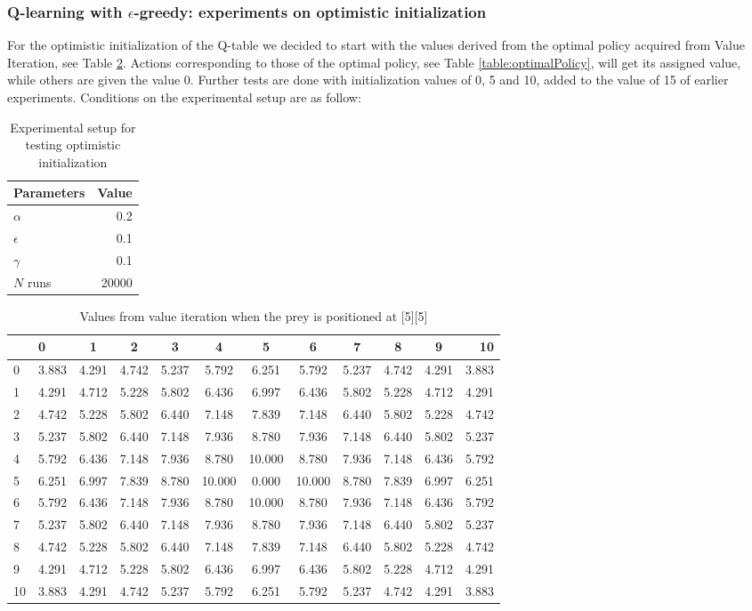\documentclass[paper=a4, fontsize=11pt]{scrartcl}
\numberwithin{equation}{section}		%
\numberwithin{figure}{section}			%
\numberwithin{table}{section}				%
\begin{document}
\subsubsection*{Q-learning with $\epsilon$-greedy: experiments on optimistic initialization}
For the optimistic initialization of the Q-table we decided to start with the values derived from the optimal policy acquired from Value Iteration, see Table \ref{table:vi}. Actions corresponding to those of the optimal policy, see Table \ref{table:optimalPolicy}, will get its assigned value, while others are given the value 0. Further tests are done with initialization values of 0, 5 and 10, added to the value of 15 of earlier experiments. Conditions on the experimental setup are as follow:
\begin{table}[H]
\caption{Experimental setup for testing optimistic initialization}
\centering
\begin{tabular}{|l|r|}
\hline
Parameters & Value \\\hline
$\alpha$ & 0.2 \\\hline
$\epsilon$ & 0.1 \\\hline
$\gamma$ & 0.1\\\hline
$N$ runs & 20000\\\hline
\end{tabular}
\label{expSetupOptimInit}
\end{table}
\begin{table}[H]
\caption{Values from value iteration when the prey is positioned at [5][5]}
\centering
\begin{tabular}{l|l*{9}{c}r}
  \hline
 & 0 & 1 & 2 & 3 & 4 & 5 & 6 & 7 & 8 & 9 & 10 \\ \hline 
0 & 3.883 & 4.291 & 4.742 & 5.237 & 5.792 & 6.251 & 5.792 & 5.237 & 4.742 & 4.291 & 3.883 \\
1 & 4.291 & 4.712 & 5.228 & 5.802 & 6.436 & 6.997 & 6.436 & 5.802 & 5.228 & 4.712 & 4.291 \\
2 & 4.742 & 5.228 & 5.802 & 6.440 & 7.148 & 7.839 & 7.148 & 6.440 & 5.802 & 5.228 & 4.742 \\
3 & 5.237 & 5.802 & 6.440 & 7.148 & 7.936 & 8.780 & 7.936 & 7.148 & 6.440 & 5.802 & 5.237 \\
4 & 5.792 & 6.436 & 7.148 & 7.936 & 8.780 & 10.000 & 8.780 & 7.936 & 7.148 & 6.436 & 5.792 \\
5 & 6.251 & 6.997 & 7.839 & 8.780 & 10.000 & 0.000 & 10.000 & 8.780 & 7.839 & 6.997 & 6.251 \\
6 & 5.792 & 6.436 & 7.148 & 7.936 & 8.780 & 10.000 & 8.780 & 7.936 & 7.148 & 6.436 & 5.792 \\
7 & 5.237 & 5.802 & 6.440 & 7.148 & 7.936 & 8.780 & 7.936 & 7.148 & 6.440 & 5.802 & 5.237 \\
8 & 4.742 & 5.228 & 5.802 & 6.440 & 7.148 & 7.839 & 7.148 & 6.440 & 5.802 & 5.228 & 4.742 \\
9& 4.291 & 4.712 & 5.228 & 5.802 & 6.436 & 6.997 & 6.436 & 5.802 & 5.228 & 4.712 & 4.291 \\
10& 3.883 & 4.291 & 4.742 & 5.237 & 5.792 & 6.251 & 5.792 & 5.237 & 4.742 & 4.291 & 3.883
\end{tabular}
\label{table:vi}
\end{table}
\end{document}
